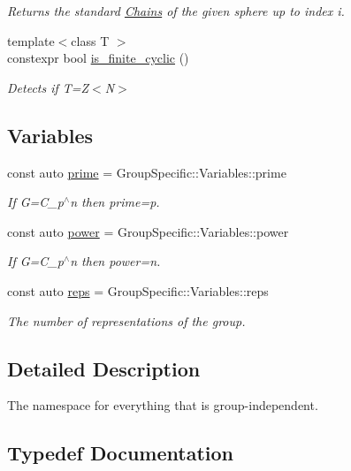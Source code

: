 \begin{DoxyCompactItemize}
\begin{DoxyCompactList}\small\item\em Returns the standard \hyperlink{classMackey_1_1Chains}{Chains} of the given sphere up to index i. \end{DoxyCompactList}\item 
{\footnotesize template$<$class T $>$ }\\constexpr bool \hyperlink{namespaceMackey_afe8e1404c86fb9609734d3e0074ac7ed}{is\+\_\+finite\+\_\+cyclic} ()
\begin{DoxyCompactList}\small\item\em Detects if T=Z$<$\+N$>$ \end{DoxyCompactList}\end{DoxyCompactItemize}
\subsection*{Variables}
\begin{DoxyCompactItemize}
\item 
const auto \hyperlink{namespaceMackey_a77e059c6f9b4c6ea096fcf94a7880bc3}{prime} = Group\+Specific\+::\+Variables\+::prime
\begin{DoxyCompactList}\small\item\em If G=C\+\_\+p$^\wedge$n then prime=p. \end{DoxyCompactList}\item 
const auto \hyperlink{namespaceMackey_aafdaaabd06dd9ceefe6fa4f26d13a60d}{power} = Group\+Specific\+::\+Variables\+::power
\begin{DoxyCompactList}\small\item\em If G=C\+\_\+p$^\wedge$n then power=n. \end{DoxyCompactList}\item 
const auto \hyperlink{namespaceMackey_af282e8433677f2812cb242359f4cd0c1}{reps} = Group\+Specific\+::\+Variables\+::reps
\begin{DoxyCompactList}\small\item\em The number of representations of the group. \end{DoxyCompactList}\end{DoxyCompactItemize}


\subsection{Detailed Description}
The namespace for everything that is group-\/independent. 

\subsection{Typedef Documentation}
\mbox{\label{namespaceMackey_a4f147e328c520f568f5d3adf1c75f514}} 
